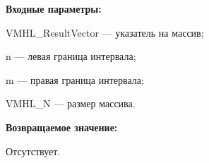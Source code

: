 \textbf{Входные параметры:}
 
VMHL\_ResultVector --- указатель на массив;
 
n --- левая граница интервала;
 
m --- правая граница интервала;
 
VMHL\_N --- размер массива.

\textbf{Возвращаемое значение:}

Отсутствует.